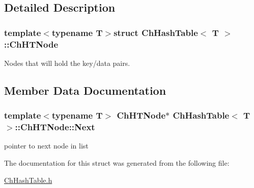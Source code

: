 \subsection{Detailed Description}
\subsubsection*{template$<$typename T$>$struct Ch\-Hash\-Table$<$ T $>$\-::\-Ch\-H\-T\-Node}

Nodes that will hold the key/data pairs. 

\subsection{Member Data Documentation}
\hypertarget{structChHashTable_1_1ChHTNode_a332fb29106442e7df383f71ccfb81f2a}{
\subsubsection[{Next}]{\setlength{\rightskip}{0pt plus 5cm}template$<$typename T$>$ {\bf Ch\-H\-T\-Node}$\ast$ {\bf Ch\-Hash\-Table}$<$ T $>$\-::Ch\-H\-T\-Node\-::\-Next}}\label{structChHashTable_1_1ChHTNode_a332fb29106442e7df383f71ccfb81f2a}
pointer to next node in list 

The documentation for this struct was generated from the following file\-:\begin{DoxyCompactItemize}
\item 
\hyperlink{ChHashTable_8h}{Ch\-Hash\-Table.\-h}\end{DoxyCompactItemize}
